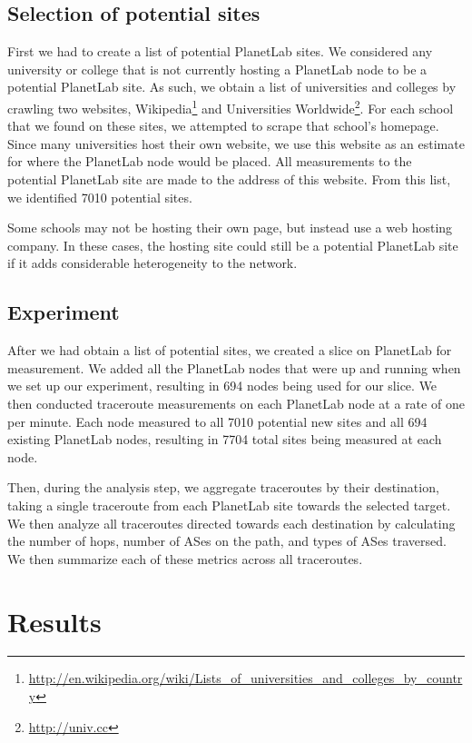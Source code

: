 \documentclass{sig-alternate-10pt}
\begin{document}
\subsection{Selection of potential sites}

First we had to create a list of potential PlanetLab sites. We considered any
university or college that is not currently hosting a PlanetLab node to be a
potential PlanetLab site. As such, we obtain a list of universities and
colleges by crawling two websites,
Wikipedia\footnote{\url{http://en.wikipedia.org/wiki/Lists_of_universities_and_colleges_by_country}}
and Universities Worldwide\footnote{\url{http://univ.cc}}. For each school that
we found on these sites, we attempted to scrape that school's homepage. Since
many universities host their own website, we use this website as an estimate
for where the PlanetLab node would be placed. All measurements to the potential
PlanetLab site are made to the address of this website. From this list, we
identified 7010 potential sites.

Some schools may not be hosting their own page, but instead use a web hosting
company. In these cases, the hosting site could still be a potential PlanetLab
site if it adds considerable heterogeneity to the network. 

\subsection{Experiment}

After we had obtain a list of potential sites, we created a slice on PlanetLab
for measurement. We added all the PlanetLab nodes that were up and running when
we set up our experiment, resulting in 694 nodes being used for our slice. We
then conducted traceroute measurements on each PlanetLab node at a rate of one
per minute. Each node measured to all 7010 potential new sites and all 694
existing PlanetLab nodes, resulting in 7704 total sites being measured at each
node. 

Then, during the analysis step, we aggregate traceroutes by their destination,
taking a single traceroute from each PlanetLab site towards the selected
target. We then analyze all traceroutes directed towards each destination by
calculating the number of hops, number of ASes on the path, and types of ASes
traversed. We then summarize each of these metrics across all traceroutes.

\section{Results}
\end{document}

